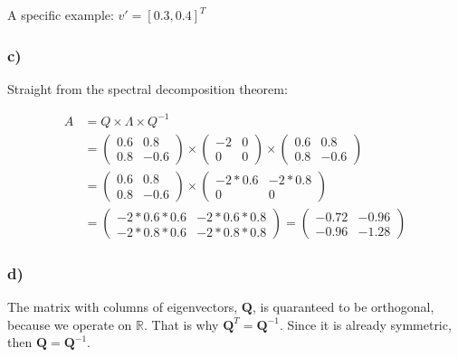 \documentclass{article}
\begin{document}
A specific example: $v' = [0.3, 0.4]^T$

\pagebreak

\subsubsection*{c)}

Straight from the spectral decomposition theorem:

\begin{align*}
    A &= Q \times \Lambda \times Q^{-1} \\
    &=
    \begin{pmatrix}
        0.6 & 0.8 \\
        0.8 & -0.6
    \end{pmatrix}
    \times
    \begin{pmatrix}
        -2 & 0\\
        0 & 0
    \end{pmatrix}
    \times
    \begin{pmatrix}
        0.6 & 0.8\\
        0.8 & -0.6
    \end{pmatrix} \\
    &=
    \begin{pmatrix}
        0.6 & 0.8 \\
        0.8 & -0.6
    \end{pmatrix}
    \times
    \begin{pmatrix}
        -2*0.6 & -2*0.8\\
        0 & 0
    \end{pmatrix}\\
    &=
    \begin{pmatrix}
        -2*0.6*0.6 & -2*0.6*0.8 \\
        -2*0.8*0.6 & -2*0.8*0.8
    \end{pmatrix}
    =
    \begin{pmatrix}
        -0.72 & -0.96 \\
        -0.96 & -1.28
    \end{pmatrix}
\end{align*}

\subsubsection*{d)}

The matrix with columns of eigenvectors, $\mathbf{Q}$, is quaranteed to be orthogonal, because we operate on $\mathbb{R}$. That is why $\mathbf{Q}^T = \mathbf {Q}^{-1}$. Since it is already symmetric, then $\mathbf{Q} = \mathbf{Q}^{-1}$.
\end{document}
